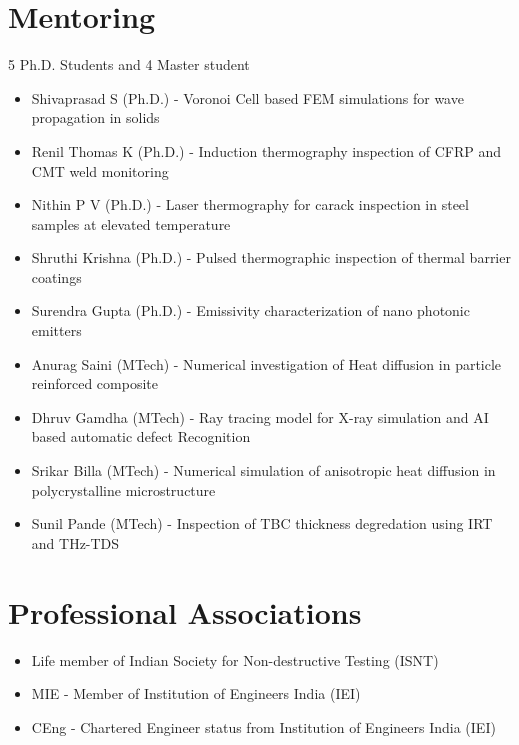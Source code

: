 \documentclass{my_cv}%
\begin{document}
\section{Mentoring}
\vspace{1em}
\noindent \faEye \hspace{1em} \color{mygray} 5 Ph.D. Students and 4 Master student 
\begin{itemize}[leftmargin=0.15in]
\setlength\itemsep{-0.1em}
\color{mygray}
\item Shivaprasad S (Ph.D.) - Voronoi Cell based FEM simulations for wave propagation in solids \cite{Shivaprasadcomsolconf2015,Shivaprasadconf2015}
\item Renil Thomas K (Ph.D.) - Induction thermography inspection of CFRP and CMT weld monitoring \cite{Renilconf2016,Kidanganconf2016,thomas2017} 
\item Nithin P V (Ph.D.) - Laser thermography for carack inspection in steel samples at elevated temperature \cite{Nithin2019,Nithinconf2016,Nithinconf2018,puthiyaveettil2020}
\item Shruthi Krishna (Ph.D.) - Pulsed thermographic inspection of thermal barrier coatings \cite{Sruthiconf2018,Krishnaconf2017}
\item Surendra Gupta (Ph.D.) - Emissivity characterization of nano photonic emitters \cite{Surendra2020}
\item Anurag Saini (MTech) - Numerical investigation of Heat diffusion in particle reinforced composite \cite{Saini2020}
\item Dhruv Gamdha (MTech) - Ray tracing model for X-ray simulation and AI based automatic defect Recognition \cite{Dhruv2019,Dhruv2020}
\item Srikar Billa (MTech) - Numerical simulation of anisotropic heat diffusion in polycrystalline microstructure
\item Sunil Pande (MTech) - Inspection of TBC thickness degredation using IRT and THz-TDS
\end{itemize}

\section{Professional Associations}
\vspace{1em}
\begin{itemize}[leftmargin=0.15in]
\setlength\itemsep{-0.1em}
\color{mygray}
\item Life member of Indian Society for Non-destructive Testing (ISNT)
\item MIE - Member of Institution of Engineers India (IEI)
\item CEng - Chartered Engineer status from Institution of Engineers India (IEI) 
\end{itemize}
\end{document}
